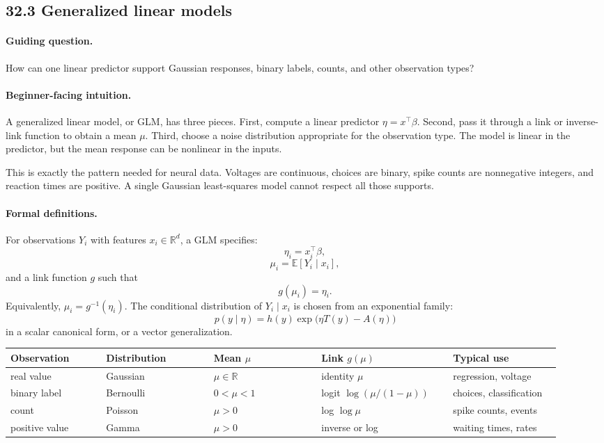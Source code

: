\subsection{32.3 Generalized linear models}

\paragraph{Guiding question.}
How can one linear predictor support Gaussian responses, binary labels, counts, and other observation types?

\paragraph{Beginner-facing intuition.}
A generalized linear model, or GLM, has three pieces. First, compute a linear predictor \(\eta=x^\top\beta\). Second, pass it through a link or inverse-link function to obtain a mean \(\mu\). Third, choose a noise distribution appropriate for the observation type. The model is linear in the predictor, but the mean response can be nonlinear in the inputs.

This is exactly the pattern needed for neural data. Voltages are continuous, choices are binary, spike counts are nonnegative integers, and reaction times are positive. A single Gaussian least-squares model cannot respect all those supports.

\paragraph{Formal definitions.}
For observations \(Y_i\) with features \(x_i\in\mathbb R^d\), a GLM specifies:
\[
\eta_i=x_i^\top\beta,
\]
\[
\mu_i=\mathbb E[Y_i\mid x_i],
\]
and a link function \(g\) such that
\[
\boxed{
g(\mu_i)=\eta_i.
}
\]
Equivalently, \(\mu_i=g^{-1}(\eta_i)\). The conditional distribution of \(Y_i\mid x_i\) is chosen from an exponential family:
\[
p(y\mid \eta)
=h(y)\exp\bigl(\eta T(y)-A(\eta)\bigr)
\]
in a scalar canonical form, or a vector generalization.

\begin{center}
\small
\setlength{\tabcolsep}{3pt}
\renewcommand{\arraystretch}{1.2}
\begin{tabular}{p{0.16\linewidth}p{0.18\linewidth}p{0.18\linewidth}p{0.22\linewidth}p{0.18\linewidth}}
\toprule
Observation & Distribution & Mean \(\mu\) & Link \(g(\mu)\) & Typical use \\
\midrule
real value & Gaussian & \(\mu\in\mathbb R\) & identity \(\mu\) & regression, voltage \\
binary label & Bernoulli & \(0<\mu<1\) & logit \(\log(\mu/(1-\mu))\) & choices, classification \\
count & Poisson & \(\mu>0\) & log \(\log\mu\) & spike counts, events \\
positive value & Gamma & \(\mu>0\) & inverse or log & waiting times, rates \\
\bottomrule
\end{tabular}
\end{center}

